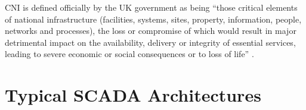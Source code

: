 CNI is defined officially by the UK government as being ``those critical elements of national infrastructure (facilities, systems, sites, property, information, people, networks and processes), the loss or compromise of which would result in major detrimental impact on the availability, delivery or integrity of essential services, leading to severe economic or social consequences or to loss of life'' \citep{site:cpni:cni}.

\pagebreak
\section{Typical SCADA Architectures}
